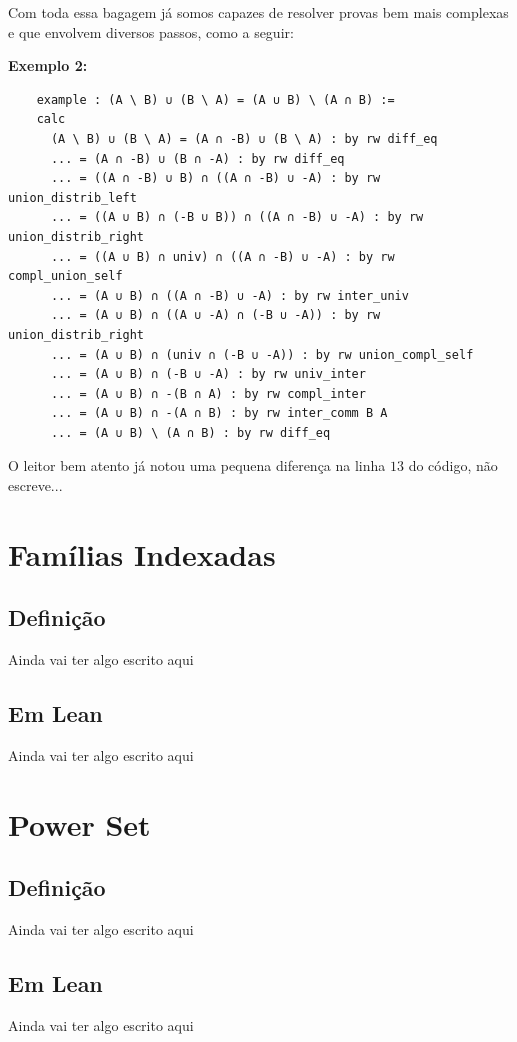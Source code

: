   Com toda essa bagagem já somos capazes de resolver provas bem mais complexas e que envolvem diversos passos, como a seguir:

  \textbf{Exemplo 2:}
  \begin{lstlisting}
    example : (A \ B) ∪ (B \ A) = (A ∪ B) \ (A ∩ B) :=
    calc
      (A \ B) ∪ (B \ A) = (A ∩ -B) ∪ (B \ A) : by rw diff_eq
      ... = (A ∩ -B) ∪ (B ∩ -A) : by rw diff_eq
      ... = ((A ∩ -B) ∪ B) ∩ ((A ∩ -B) ∪ -A) : by rw union_distrib_left
      ... = ((A ∪ B) ∩ (-B ∪ B)) ∩ ((A ∩ -B) ∪ -A) : by rw union_distrib_right
      ... = ((A ∪ B) ∩ univ) ∩ ((A ∩ -B) ∪ -A) : by rw compl_union_self
      ... = (A ∪ B) ∩ ((A ∩ -B) ∪ -A) : by rw inter_univ
      ... = (A ∪ B) ∩ ((A ∪ -A) ∩ (-B ∪ -A)) : by rw union_distrib_right
      ... = (A ∪ B) ∩ (univ ∩ (-B ∪ -A)) : by rw union_compl_self
      ... = (A ∪ B) ∩ (-B ∪ -A) : by rw univ_inter
      ... = (A ∪ B) ∩ -(B ∩ A) : by rw compl_inter
      ... = (A ∪ B) ∩ -(A ∩ B) : by rw inter_comm B A
      ... = (A ∪ B) \ (A ∩ B) : by rw diff_eq \end{lstlisting}

  O leitor bem atento já notou uma pequena diferença na linha $13$ do código, não escreve...

\section{Famílias Indexadas}

  \subsection{Definição}
  Ainda vai ter algo escrito aqui

  \subsection{Em Lean}
  Ainda vai ter algo escrito aqui

\section{Power Set}

  \subsection{Definição}
  Ainda vai ter algo escrito aqui

  \subsection{Em Lean}
  Ainda vai ter algo escrito aqui

